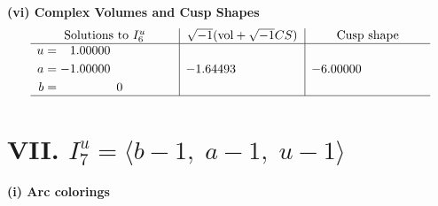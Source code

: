 \documentclass[1p]{elsarticle_modified}
\theoremstyle{definition}
\newcommand{\I}{\sqrt{-1}}
\begin{document}
\newpage\flushleft \textbf{(vi) Complex Volumes and Cusp Shapes}
$$\begin{array}{c|c|c}  
\text{Solutions to }I^u_{6}& \I (\text{vol} + \sqrt{-1}CS) & \text{Cusp shape}\\
 \hline 
\begin{aligned}
u &= \phantom{-}1.00000\phantom{ +0.000000I} \\
a &= -1.00000\phantom{ +0.000000I} \\
b &= \phantom{-0.000000 } 0\end{aligned}
 & -1.64493\phantom{ +0.000000I} & -6.00000\phantom{ +0.000000I}\\
 \hline 
 \end{array}$$\newpage\newpage\renewcommand{\arraystretch}{1}
\centering \section*{VII. $I^u_{7}= \langle b-1,\;a-1,\;u-1 \rangle$}
\flushleft \textbf{(i) Arc colorings}\\
\end{document}
